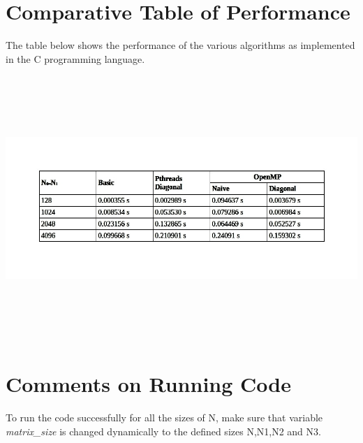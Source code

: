 \documentclass[12pt, a4paper, fleqn, titlepage]{article}
\begin{document}
\section{Comparative Table of  Performance}
    The table below shows the performance of the various algorithms as implemented in the C programming language.
    \begin{flushleft}
        \includegraphics[width= 18cm,height = 10cm, keepaspectratio,scale=0.5]{performance-table}
    \end{flushleft}
\section{Comments on Running Code}
    To run the code successfully for all the sizes of N, make sure that variable \emph{matrix\_size} is changed dynamically to the defined sizes N,N1,N2 and N3.
\end{document}
